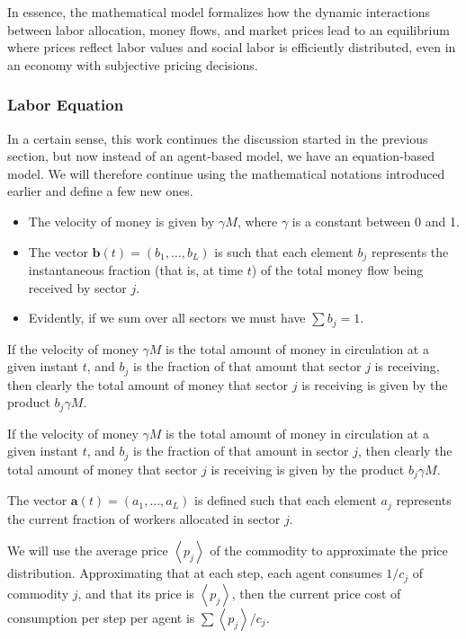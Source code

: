 In essence, the mathematical model formalizes how the dynamic interactions between labor allocation, money flows, and market prices lead to an equilibrium where prices reflect labor values and social labor is efficiently distributed, even in an economy with subjective pricing decisions.

\subsubsection{Labor Equation}

In a certain sense, this work continues the discussion started in the previous section, but now instead of an agent-based model, we have an equation-based model. We will therefore continue using the mathematical notations introduced earlier and define a few new ones.

\begin{itemize}
    \item The velocity of money is given by $\gamma M$, where $\gamma$ is a constant between 0 and 1.
\item The vector $\boldsymbol{b}\left(t\right)=\left(b_{1},\dots,b_{L}\right)$ is such that each element $b_j$ represents the instantaneous fraction (that is, at time $t$) of the total money flow being received by sector $j$.
\item Evidently, if we sum over all sectors we must have $\sum b_{j}=1$.
\end{itemize}


If the velocity of money $\gamma M$ is the total amount of money in circulation at a given instant $t$, and $b_j$ is the fraction of that amount that sector $j$ is receiving, then clearly the total amount of money that sector $j$ is receiving is given by the product $b_j \gamma M$.


If the velocity of money $\gamma M$ is the total amount of money in circulation at a given instant $t$, and $b_j$ is the fraction of that amount in sector $j$, then clearly the total amount of money that sector $j$ is receiving is given by the product $b_j \gamma M$.

The vector $\boldsymbol{a}\left(t\right)=\left(a_{1},\dots,a_{L}\right)$ is defined such that each element $a_j$ represents the current fraction of workers allocated in sector $j$.

We will use the average price $\left\langle p_{j}\right\rangle$ of the commodity to approximate the price distribution. Approximating that at each step, each agent consumes $1/c_j$ of commodity $j$, and that its price is $\left\langle p_{j}\right\rangle$, then the current price cost of consumption per step per agent is $\sum\left\langle p_{j}\right\rangle /c_{j}$.

